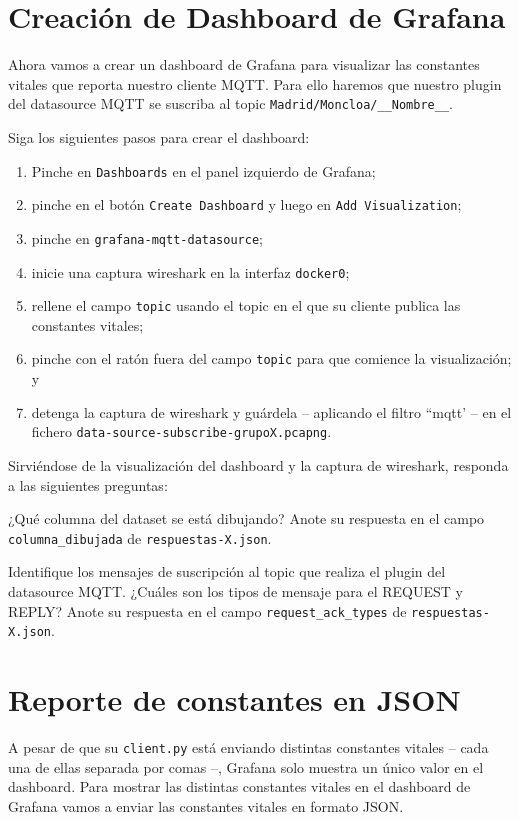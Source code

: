 \documentclass{upmassignment}
\begin{document}
\section*{Creación de Dashboard de Grafana}
Ahora vamos a crear un dashboard de Grafana
para visualizar las constantes vitales
que reporta nuestro cliente MQTT.
Para ello haremos que nuestro plugin
del datasource MQTT se suscriba al topic
\texttt{Madrid/Moncloa/\_\_Nombre\_\_}.


Siga los siguientes pasos para crear el
dashboard:
\begin{enumerate}
    \item Pinche en \texttt{Dashboards} en el
        panel izquierdo de Grafana;
    \item pinche en el botón
        \texttt{Create Dashboard} y luego
        en \texttt{Add Visualization};
    \item pinche en
        \texttt{grafana-mqtt-datasource};
    \item inicie una captura wireshark
        en la interfaz \texttt{docker0};
    \item rellene el campo \texttt{topic}
        usando el topic en el que su cliente
        publica las constantes vitales;
    \item pinche con el ratón fuera del
        campo \texttt{topic} para que comience
        la visualización; y
    \item detenga la captura de wireshark
        y guárdela -- aplicando el
        filtro ``mqtt' -- en el
        fichero
        \texttt{data-source-subscribe-grupoX.pcapng}.
\end{enumerate}


Sirviéndose de la visualización del
dashboard y la captura de wireshark,
responda a las siguientes preguntas:
\begin{problemlist}
\setcounter{enumi}{4}
    \pbitem ¿Qué columna del dataset
        se está dibujando?
        Anote su respuesta en el campo
        \texttt{columna\_dibujada}
        de \texttt{respuestas-X.json}.

    \pbitem Identifique los mensajes
        de suscripción al topic que
        realiza el plugin del datasource
        MQTT.
        ¿Cuáles son los tipos de mensaje
        para el REQUEST y REPLY?
        Anote su respuesta en el campo
        \texttt{request\_ack\_types}
        de \texttt{respuestas-X.json}.
\end{problemlist}




\section*{Reporte de constantes en JSON}
A pesar de que su \texttt{client.py} está
enviando distintas constantes vitales --
cada una de ellas separada por comas --,
Grafana solo muestra un único valor
en el dashboard. Para mostrar las distintas
constantes vitales en el dashboard de
Grafana vamos a enviar las constantes
vitales en formato JSON.
\end{document}
